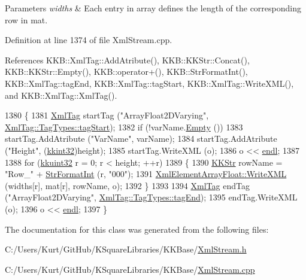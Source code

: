 \begin{DoxyParams}{Parameters}
{\em widths} & Each entry in array defines the length of the corresponding row in \textquotesingle{}mat\textquotesingle{}. \\
\hline
\end{DoxyParams}


Definition at line 1374 of file Xml\+Stream.\+cpp.



References K\+K\+B\+::\+Xml\+Tag\+::\+Add\+Atribute(), K\+K\+B\+::\+K\+K\+Str\+::\+Concat(), K\+K\+B\+::\+K\+K\+Str\+::\+Empty(), K\+K\+B\+::operator+(), K\+K\+B\+::\+Str\+Format\+Int(), K\+K\+B\+::\+Xml\+Tag\+::tag\+End, K\+K\+B\+::\+Xml\+Tag\+::tag\+Start, K\+K\+B\+::\+Xml\+Tag\+::\+Write\+X\+M\+L(), and K\+K\+B\+::\+Xml\+Tag\+::\+Xml\+Tag().


\begin{DoxyCode}
1380 \{
1381   \hyperlink{class_k_k_b_1_1_xml_tag}{XmlTag} startTag (\textcolor{stringliteral}{"ArrayFloat2DVarying"}, \hyperlink{class_k_k_b_1_1_xml_tag_a6c0ef0e23f982f49d55d4fb7eaff6ac9ab02b23b5e15b3a1353771313e1176ce0}{XmlTag::TagTypes::tagStart});
1382   \textcolor{keywordflow}{if}  (!varName.\hyperlink{class_k_k_b_1_1_k_k_str_ac69942f73fffd672ec2a6e1c410afdb6}{Empty} ())
1383     startTag.AddAtribute (\textcolor{stringliteral}{"VarName"}, varName);
1384   startTag.AddAtribute (\textcolor{stringliteral}{"Height"}, (\hyperlink{namespace_k_k_b_a8fa4952cc84fda1de4bec1fbdd8d5b1b}{kkint32})height);
1385   startTag.WriteXML (o);
1386   o << \hyperlink{namespace_k_k_b_ad1f50f65af6adc8fa9e6f62d007818a8}{endl};
1387 
1388   \textcolor{keywordflow}{for}  (\hyperlink{namespace_k_k_b_af8d832f05c54994a1cce25bd5743e19a}{kkuint32} r = 0;  r < height;  ++r)
1389   \{
1390     \hyperlink{class_k_k_b_1_1_k_k_str}{KKStr} rowName = \textcolor{stringliteral}{"Row\_"} + \hyperlink{namespace_k_k_b_ae3bde258fa036604fac8bdb0277ab46e}{StrFormatInt} (r, \textcolor{stringliteral}{"000"});
1391     \hyperlink{class_k_k_b_1_1_xml_element_array_float_a78bc9a4e11950ad7706a46f1d7da9749}{XmlElementArrayFloat::WriteXML} (widths[r], mat[r], rowName, o);
1392   \}
1393 
1394   \hyperlink{class_k_k_b_1_1_xml_tag}{XmlTag}  endTag (\textcolor{stringliteral}{"ArrayFloat2DVarying"}, \hyperlink{class_k_k_b_1_1_xml_tag_a6c0ef0e23f982f49d55d4fb7eaff6ac9a3ceaa9a790f688ec97a35b5a3fd3b164}{XmlTag::TagTypes::tagEnd});
1395   endTag.WriteXML (o);
1396   o << \hyperlink{namespace_k_k_b_ad1f50f65af6adc8fa9e6f62d007818a8}{endl};
1397 \}
\end{DoxyCode}


The documentation for this class was generated from the following files\+:\begin{DoxyCompactItemize}
\item 
C\+:/\+Users/\+Kurt/\+Git\+Hub/\+K\+Square\+Libraries/\+K\+K\+Base/\hyperlink{_xml_stream_8h}{Xml\+Stream.\+h}\item 
C\+:/\+Users/\+Kurt/\+Git\+Hub/\+K\+Square\+Libraries/\+K\+K\+Base/\hyperlink{_xml_stream_8cpp}{Xml\+Stream.\+cpp}\end{DoxyCompactItemize}
